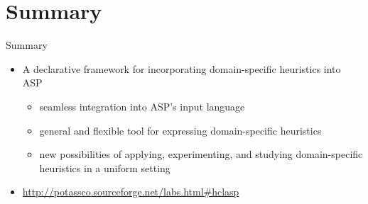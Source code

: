 \documentclass[t]{beamer}
\begin{document}
\section{Summary}
\begin{frame}[c]{Summary}
  \begin{itemize}
  \item A declarative framework for incorporating domain-specific heuristics into ASP
    \begin{itemize}
    \item seamless integration into ASP's input language
    \item general and flexible tool for expressing domain-specific heuristics
    \item new possibilities of applying, experimenting, and studying
      domain-specific heuristics in a uniform setting
    \end{itemize}
    \medskip
  \item \url{http://potassco.sourceforge.net/labs.html\#hclasp}
  \end{itemize}
\end{frame}
\end{document}
